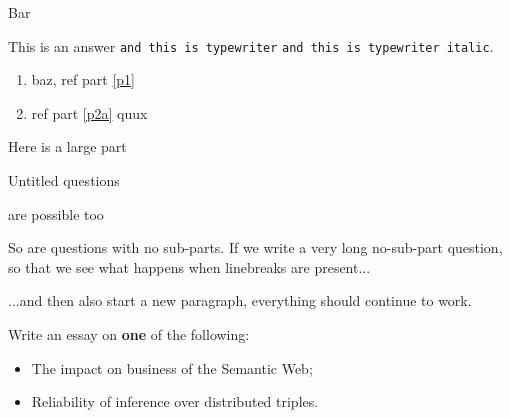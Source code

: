 \documentclass{gsexam}
\begin{document}
\begin{bscexam}

\subject{Computer Science}

\coverpage

\begin{question}{25}
\item \label{p1} Bar 
\begin{answer}
  This is an answer {\tt and this is typewriter} \texttt{and this is
    typewriter italic}.
\end{answer}
\item 
  \begin{enumerate}
  \item \label{p2a} baz, ref part \ref{p1}
  \item ref part \ref{p2a} quux
  \end{enumerate}
\end{question}
\clearpage
\begin{question}{2}
\item \label{p2} Here is a large part
\end{question}
\clearpage
\begin{question}{24}
\item Untitled questions 
\item are possible too 
\end{question}
\clearpage
\begin{question}{17}
  So are questions with no sub-parts.  If we write a very long
  no-sub-part question, so that we see what happens when linebreaks
  are present... 

  ...and then also start a new paragraph, everything should continue to
  work.  
\end{question}
\clearpage
\begin{question}{24}
  \item Write an essay on \textbf{one} of the following:
    \begin{itemize}
    \item The impact on business of the Semantic Web;
    \item Reliability of inference over distributed triples.
    \end{itemize}
  \end{question}

\end{bscexam}
\end{document}
